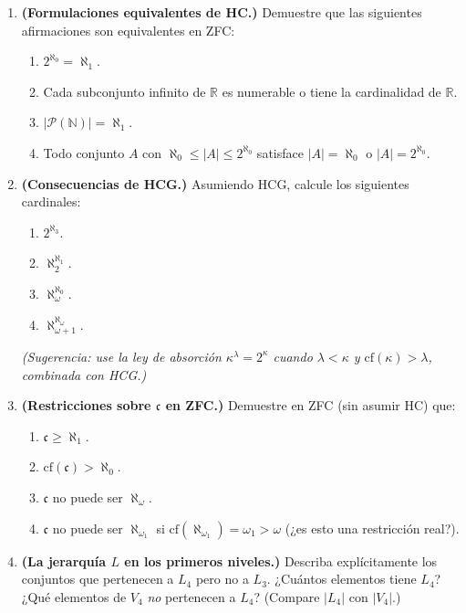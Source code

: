 \begin{enumerate}[leftmargin=2em, label=\textbf{P\arabic*.}]

  \item \textbf{(Formulaciones equivalentes de HC.)} Demuestre que las siguientes afirmaciones son equivalentes en ZFC:
  \begin{enumerate}[label=(\alph*)]
    \item $2^{\aleph_0} = \aleph_1$.
    \item Cada subconjunto infinito de $\mathbb{R}$ es numerable o tiene la cardinalidad de $\mathbb{R}$.
    \item $|\mathcal{P}(\mathbb{N})| = \aleph_1$.
    \item Todo conjunto $A$ con $\aleph_0 \leq |A| \leq 2^{\aleph_0}$ satisface $|A| = \aleph_0$ o $|A| = 2^{\aleph_0}$.
  \end{enumerate}

  \item \textbf{(Consecuencias de HCG.)} Asumiendo HCG, calcule los siguientes cardinales:
  \begin{enumerate}[label=(\alph*)]
    \item $2^{\aleph_3}$.
    \item $\aleph_2^{\aleph_1}$.
    \item $\aleph_\omega^{\aleph_0}$.
    \item $\aleph_{\omega+1}^{\aleph_\omega}$.
  \end{enumerate}
  \textit{(Sugerencia: use la ley de absorción $\kappa^\lambda = 2^\kappa$ cuando $\lambda < \kappa$ y $\mathrm{cf}(\kappa) > \lambda$, combinada con HCG.)}

  \item \textbf{(Restricciones sobre $\mathfrak{c}$ en ZFC.)} Demuestre en ZFC (sin asumir HC) que:
  \begin{enumerate}[label=(\alph*)]
    \item $\mathfrak{c} \geq \aleph_1$.
    \item $\mathrm{cf}(\mathfrak{c}) > \aleph_0$.
    \item $\mathfrak{c}$ no puede ser $\aleph_\omega$.
    \item $\mathfrak{c}$ no puede ser $\aleph_{\omega_1}$ si $\mathrm{cf}(\aleph_{\omega_1}) = \omega_1 > \omega$ (¿es esto una restricción real?).
  \end{enumerate}

  \item \textbf{(La jerarquía $L$ en los primeros niveles.)} Describa explícitamente los conjuntos que pertenecen a $L_4$ pero no a $L_3$. ¿Cuántos elementos tiene $L_4$? ¿Qué elementos de $V_4$ \emph{no} pertenecen a $L_4$? (Compare $|L_4|$ con $|V_4|$.)


\end{enumerate}
